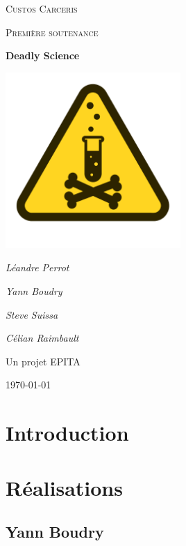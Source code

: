 \documentclass{article}
\begin{document}
\begin{titlepage}
	\centering
	{\scshape\LARGE Custos Carceris\par}
	\vspace{1cm}
	{\scshape\Large Première soutenance \par}
	\vspace{1.5cm}
	{\huge\bfseries Deadly Science\par}
	\vspace{2cm}
	\includegraphics[width=0.5\textwidth]{logo.png}\par\vspace{1cm}
	{\Large\itshape Léandre Perrot\par}
	{\Large\itshape Yann Boudry\par}
	{\Large\itshape Steve Suissa\par}
	{\Large\itshape Célian Raimbault\par}
	\vfill
	Un projet EPITA
	\vfill
	{\large \today\par}
\end{titlepage}



\newpage
\tableofcontents



\section{Introduction}

\newpage
\section{Réalisations}


\subsection{Yann Boudry}
\end{document}
